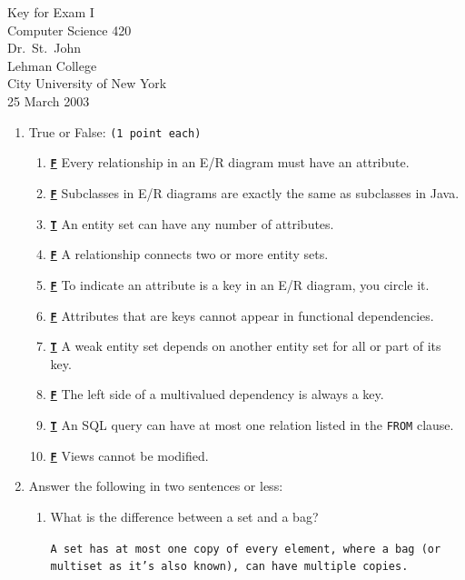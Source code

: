 \documentclass[12pt]{article}
\begin{document}
{%
\begin{center}
    Key for Exam I\\
    Computer Science 420 \\
    Dr.~St.~John\\ 
    Lehman College\\
    City University of New York\\ 
    25 March 2003
\end{center}
}

\begin{enumerate}

    \item True or False:  {\tt(1 point each)}
    \begin{enumerate}
        \item \underline{\tt\bf F} Every relationship in an E/R diagram must have an attribute.
        \item \underline{\tt\bf F} Subclasses in E/R diagrams are exactly the same as subclasses in Java. 
        \item \underline{\tt\bf T} An entity set can have any number of attributes.
        \item \underline{\tt\bf F}  A relationship connects two or more entity sets.
        \item \underline{\tt\bf F}  To indicate an attribute is a key in an E/R diagram, you circle it.
        \item \underline{\tt\bf F} Attributes that are keys cannot 
		appear in functional dependencies.
        \item \underline{\tt\bf T} A weak entity set depends on another entity set for all or part of its key.
        \item \underline{\tt\bf F} The left side of a multivalued dependency is always a key.
        \item \underline{\tt\bf T} An SQL query can have at most one relation listed in the 
		{\tt FROM} clause.
        \item \underline{\tt\bf F} Views cannot be modified.
    \end{enumerate}

\item Answer the following in two sentences or less:
\begin{enumerate}
    \item What is the difference between a set and a bag?
	\\
	{\tt  A set has at most one copy of every element, where a bag (or multiset as it's also known),
	can have multiple copies.
	
}
\end{enumerate}
\end{enumerate}
\end{document}
